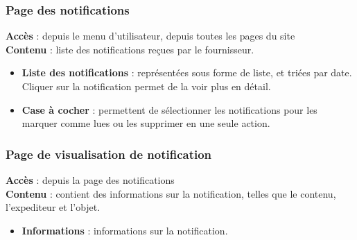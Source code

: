 \documentclass[../rapport.tex]{subfiles}
\begin{document}
\subsubsection{Page des notifications}
\noindent \textbf{Accès} :  depuis le menu d'utilisateur, depuis toutes les pages du site\\
\textbf{Contenu }: liste des notifications reçues par le fournisseur.
\begin{itemize}
    \item \textbf{Liste des notifications} : représentées sous forme de liste, et triées par date. Cliquer sur la notification permet de la voir plus en détail.
    \item \textbf{Case à cocher} : permettent de sélectionner les notifications pour les marquer comme lues ou les supprimer en une seule action.
\end{itemize}

\subsubsection{Page de visualisation de notification}
\noindent \textbf{Accès} :  depuis la page des notifications\\
\textbf{Contenu }: contient des informations sur la notification, telles que le contenu, l'expediteur et l'objet.
\begin{itemize}
    \item \textbf{Informations} : informations sur la notification.
\end{itemize}
\end{document}
